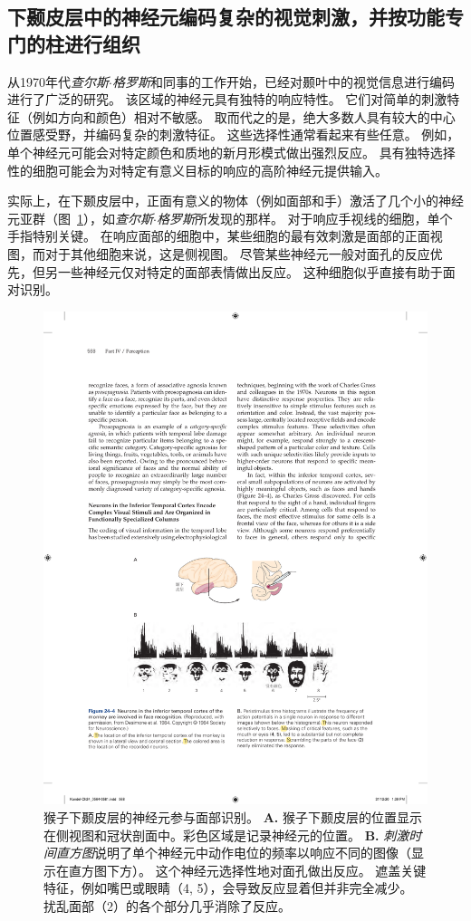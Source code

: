 \subsection{下颞皮层中的神经元编码复杂的视觉刺激，并按功能专门的柱进行组织}

从1970年代\textit{查尔斯$\cdot$格罗斯}和同事的工作开始，已经对颞叶中的视觉信息进行编码进行了广泛的研究。
该区域的神经元具有独特的响应特性。
它们对简单的刺激特征（例如方向和颜色）相对不敏感。 
取而代之的是，绝大多数人具有较大的中心位置感受野，并编码复杂的刺激特征。
这些选择性通常看起来有些任意。
例如，单个神经元可能会对特定颜色和质地的新月形模式做出强烈反应。
具有独特选择性的细胞可能会为对特定有意义目标的响应的高阶神经元提供输入。


实际上，在下颞皮层中，正面有意义的物体（例如面部和手）激活了几个小的神经元亚群（图~\ref{fig:24_4}），如\textit{查尔斯$\cdot$格罗斯}所发现的那样。
对于响应手视线的细胞，单个手指特别关键。
在响应面部的细胞中，某些细胞的最有效刺激是面部的正面视图，而对于其他细胞来说，这是侧视图。
尽管某些神经元一般对面孔的反应优先，但另一些神经元仅对特定的面部表情做出反应。
这种细胞似乎直接有助于面对识别。


\begin{figure}[htbp]
	\centering
	\includegraphics[width=0.95\linewidth]{chap24/fig_24_4}
	\caption{猴子下颞皮层的神经元参与面部识别。
		\textbf{A.} 猴子下颞皮层的位置显示在侧视图和冠状剖面中。彩色区域是记录神经元的位置。 
		\textbf{B.} \textit{刺激时间直方图}说明了单个神经元中动作电位的频率以响应不同的图像（显示在直方图下方）。
		这个神经元选择性地对面孔做出反应。
		遮盖关键特征，例如嘴巴或眼睛（4, 5），会导致反应显着但并非完全减少。
		扰乱面部（2）的各个部分几乎消除了反应。}
	\label{fig:24_4}
\end{figure}


